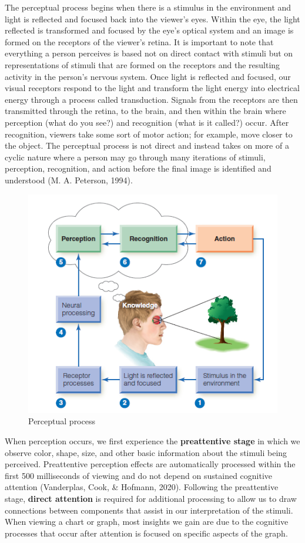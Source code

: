 \documentclass[print]{nuthesis}
\begin{document}
The perceptual process begins when there is a stimulus in the environment and light is reflected and focused back into the viewer's eyes.
Within the eye, the light reflected is transformed and focused by the eye's optical system and an image is formed on the receptors of the viewer's retina.
It is important to note that everything a person perceives is based not on direct contact with stimuli but on representations of stimuli that are formed on the receptors and the resulting activity in the person's nervous system.
Once light is reflected and focused, our visual receptors respond to the light and transform the light energy into electrical energy through a process called transduction.
Signals from the receptors are then transmitted through the retina, to the brain, and then within the brain where perception (what do you see?) and recognition (what is it called?) occur.
After recognition, viewers take some sort of motor action; for example, move closer to the object.
The perceptual process is not direct and instead takes on more of a cyclic nature where a person may go through many iterations of stimuli, perception, recognition, and action before the final image is identified and understood (M. A. Peterson, 1994).

\begin{figure}[tbp]

{\centering \includegraphics[width=0.75\linewidth,]{images/perceptual-process-goldsein-pg5} 

}

\caption{Perceptual process}\label{fig:perceptual-process}
\end{figure}

When perception occurs, we first experience the \textbf{preattentive stage} in which we observe color, shape, size, and other basic information about the stimuli being perceived. Preattentive perception effects are automatically processed within the first 500 milliseconds of viewing and do not depend on sustained cognitive attention (Vanderplas, Cook, \& Hofmann, 2020).
Following the preattentive stage, \textbf{direct attention} is required for additional processing to allow us to draw connections between components that assist in our interpretation of the stimuli.
When viewing a chart or graph, most insights we gain are due to the cognitive processes that occur after attention is focused on specific aspects of the graph.
\end{document}

